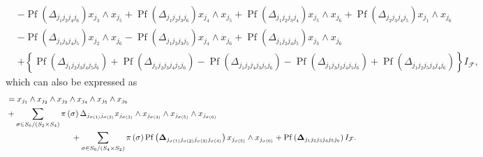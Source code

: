 \documentclass[aps, preprint]{revtex4}
\begin{document}
\begin{align}
 &  -\ensuremath{\operatorname*{Pf}} \left ( \Delta _{j_{1} j_{2} j_{4} j_{6}}\right ) x_{j_{3}} \wedge x_{j_{5}} +\ensuremath{\operatorname*{Pf}} \left ( \Delta _{j_{1} j_{2} j_{3} j_{6}}\right ) x_{j_{4}} \wedge x_{j_{5}} +\ensuremath{\operatorname*{Pf}} \left ( \Delta _{j_{1} j_{2} j_{3} j_{4}}\right ) x_{j_{5}} \wedge x_{j_{6}} +\ensuremath{\operatorname*{Pf}} \left ( \Delta _{j_{2} j_{3} j_{4} j_{5}}\right ) x_{j_{1}} \wedge x_{j_{6}} \nonumber  \\
 &  -\ensuremath{\operatorname*{Pf}} \left ( \Delta _{j_{1} j_{3} j_{4} j_{5}}\right ) x_{j_{2}} \wedge x_{j_{6}} -\ensuremath{\operatorname*{Pf}} \left ( \Delta _{j_{1} j_{2} j_{3} j_{5}}\right ) x_{j_{4}} \wedge x_{j_{6}} +\ensuremath{\operatorname*{Pf}} \left ( \Delta _{j_{1} j_{2} j_{4} j_{5}}\right ) x_{j_{3}} \wedge x_{j_{6}} \nonumber  \\
 &  +\left \{\ensuremath{\operatorname*{Pf}} \left ( \Delta _{j_{1} j_{2} j_{3} j_{4} j_{5} j_{6}}\right ) +\ensuremath{\operatorname*{Pf}} \left ( \Delta _{j_{1} j_{2} j_{3} j_{4} j_{5} j_{6}}\right ) -\ensuremath{\operatorname*{Pf}} \left ( \Delta _{j_{1} j_{2} j_{4} j_{3} j_{5} j_{6}}\right ) -\ensuremath{\operatorname*{Pf}} \left ( \Delta _{j_{1} j_{3} j_{2} j_{4} j_{5} j_{6}}\right ) +\ensuremath{\operatorname*{Pf}} \left ( \Delta _{j_{1} j_{2} j_{5} j_{3} j_{4} j_{6}}\right )\right \} I_{\mathcal{F}}\text{,}\end{align}which can also be expressed as
\begin{align} &  =x_{j_{1}} \wedge x_{j_{2}} \wedge x_{j_{3}} \wedge x_{j_{4}} \wedge x_{j_{5}} \wedge x_{j_{6}} \nonumber  \\
 &  +\sum _{\sigma  \in S_{6}/\left (S_{2} \times S_{4}\right )}\pi  \left (\sigma \right )  \Delta _{j_{\sigma  \left (1\right )} j_{\sigma  \left (2\right )}}x_{j_{\sigma  \left (3\right )}} \wedge x_{j_{\sigma  \left (4\right )}} \wedge x_{j_{\sigma  \left (5\right )}} \wedge x_{j_{\sigma  \left (6\right )}} \nonumber  \\
 & \text{\quad \quad \quad \quad \quad \quad \quad \quad } +\sum _{\sigma  \in S_{6}/\left (S_{4} \times S_{2}\right )}\pi  \left (\sigma \right ) \ensuremath{\operatorname*{Pf}} \left (\mathbf{\Delta }_{j_{\sigma  \left (1\right )} j_{\sigma  \left (2\right )} j_{\sigma  \left (3\right )} j_{\sigma  \left (4\right )}}\right ) x_{j_{\sigma  \left (5\right )}} \wedge x_{j_{\sigma  \left (6\right )}} +\ensuremath{\operatorname*{Pf}} \left (\mathbf{\Delta }_{j_{1} j_{2} j_{3} j_{4} j_{5} j_{6}}\right ) I_{\mathcal{F}}\text{.}\end{align}
\end{document}
